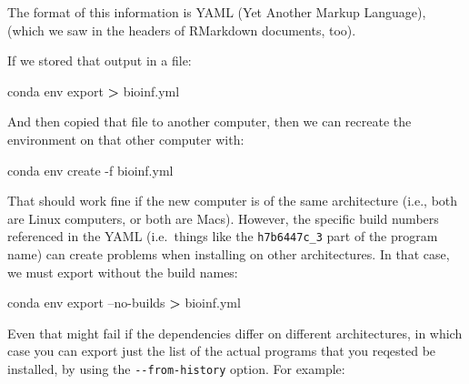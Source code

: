 \documentclass[]{krantz}
\makeatletter
\newenvironment{Shaded}{\begin{snugshade}}{\end{snugshade}}
\newcommand{\ExtensionTok}[1]{#1}
\newcommand{\NormalTok}[1]{#1}
\newcommand{\OperatorTok}[1]{\textcolor[rgb]{0.43,0.43,0.43}{\textbf{#1}}}
\newenvironment{kframe}{%
\medskip{}
\setlength{\fboxsep}{.8em}
 \def\at@end@of@kframe{}%
 \ifinner\ifhmode%
  \def\at@end@of@kframe{\end{minipage}}%
  \begin{minipage}{\columnwidth}%
 \fi\fi%
 \def\FrameCommand##1{\hskip\@totalleftmargin \hskip-\fboxsep
 \colorbox{shadecolor}{##1}\hskip-\fboxsep
     \hskip-\linewidth \hskip-\@totalleftmargin \hskip\columnwidth}%
 \MakeFramed {\advance\hsize-\width
   \@totalleftmargin\z@ \linewidth\hsize
   \@setminipage}}%
 {\par\unskip\endMakeFramed%
 \at@end@of@kframe}
\renewenvironment{Shaded}{\begin{kframe}}{\end{kframe}}
\makeatother
\begin{document}
The format of this information is YAML (Yet Another Markup Language),
(which we saw in the headers of RMarkdown documents, too).

If we stored that output in a file:

\begin{Shaded}
\begin{Highlighting}[]
\ExtensionTok{conda}\NormalTok{ env export }\OperatorTok{>}\NormalTok{ bioinf.yml}
\end{Highlighting}
\end{Shaded}

And then copied that file to another computer, then we can recreate
the environment on that other computer with:

\begin{Shaded}
\begin{Highlighting}[]
\ExtensionTok{conda}\NormalTok{ env create -f bioinf.yml}
\end{Highlighting}
\end{Shaded}

That should work fine if the new computer is of the same architecture (i.e., both
are Linux computers, or both are Macs). However, the specific build numbers
referenced in the YAML (i.e.~things like the \texttt{h7b6447c\_3} part of the program name)
can create problems when installing on other architectures. In that case, we must
export without the build names:

\begin{Shaded}
\begin{Highlighting}[]
\ExtensionTok{conda}\NormalTok{ env export --no-builds }\OperatorTok{>}\NormalTok{ bioinf.yml}
\end{Highlighting}
\end{Shaded}

Even that might fail if the dependencies differ on different architectures,
in which case you can export just the list of the actual programs that
you reqested be installed, by using the \texttt{-\/-from-history} option. For example:

\begin{Shaded}
\end{Shaded}
\end{document}
